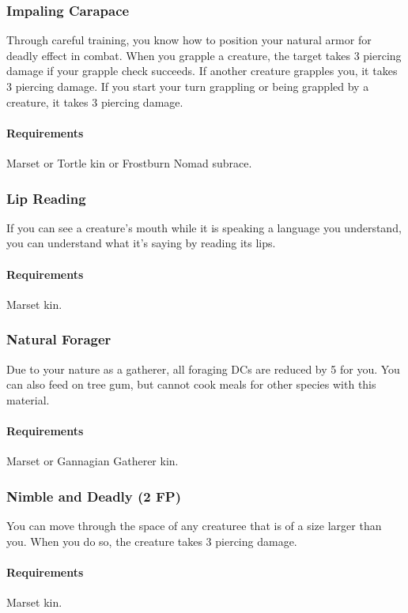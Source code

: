     \subsubsection{Impaling Carapace} \label{feat::impalingcarapace}
        Through careful training, you know how to position your natural armor for deadly effect in combat.
        When you grapple a creature, the target takes 3 piercing damage if your grapple check succeeds.
        If another creature grapples you, it takes 3 piercing damage.
        If you start your turn grappling or being grappled by a creature, it takes 3 piercing damage.
        \paragraph{Requirements} Marset or Tortle kin or Frostburn Nomad subrace.
    \subsubsection{Lip Reading} \label{feat::lipreading}
        If you can see a creature's mouth while it is speaking a language you understand, you can understand what it's saying by reading its lips.
        \paragraph{Requirements} Marset kin.
    \subsubsection{Natural Forager} \label{feat::naturalforager}
        Due to your nature as a gatherer, all foraging DCs are reduced by 5 for you.
        You can also feed on tree gum, but cannot cook meals for other species with this material.
        \paragraph{Requirements} Marset or Gannagian Gatherer kin.
    \subsubsection{Nimble and Deadly (2 FP)} \label{feat::nimbleanddeadly}
        You can move through the space of any creaturee that is of a size larger than you.
        When you do so, the creature takes 3 piercing damage.
        \paragraph{Requirements} Marset kin.
